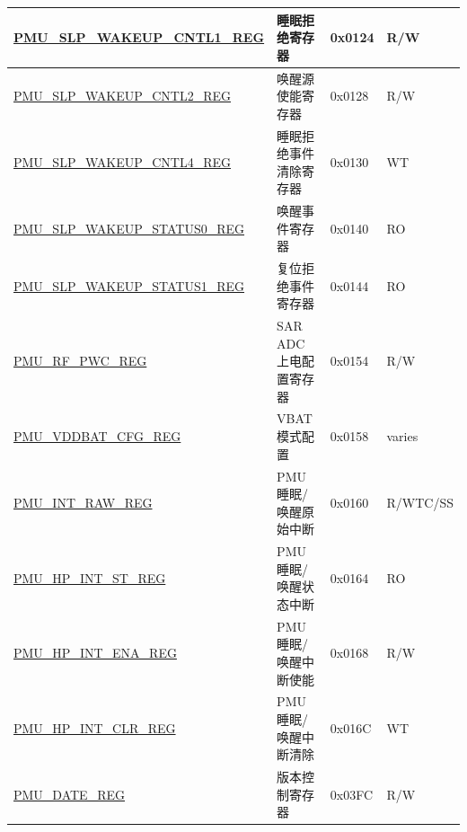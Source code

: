 \begin{longtable}{ | l | L{6cm} | l | l | }
\hyperref[regdesc:PMUSLPWAKEUPCNTL1REG]{PMU\_SLP\_WAKEUP\_CNTL1\_REG} & 睡眠拒绝寄存器 & 0x0124 & R/W \\ \hline
\hyperref[regdesc:PMUSLPWAKEUPCNTL2REG]{PMU\_SLP\_WAKEUP\_CNTL2\_REG} & 唤醒源使能寄存器 & 0x0128 & R/W \\ \hline
\hyperref[regdesc:PMUSLPWAKEUPCNTL4REG]{PMU\_SLP\_WAKEUP\_CNTL4\_REG} & 睡眠拒绝事件清除寄存器 & 0x0130 & WT \\ \hline
\hyperref[regdesc:PMUSLPWAKEUPSTATUS0REG]{PMU\_SLP\_WAKEUP\_STATUS0\_REG} & 唤醒事件寄存器 & 0x0140 & RO \\ \hline
\hyperref[regdesc:PMUSLPWAKEUPSTATUS1REG]{PMU\_SLP\_WAKEUP\_STATUS1\_REG} & 复位拒绝事件寄存器 & 0x0144 & RO \\ \hline
\hyperref[regdesc:PMURFPWCREG]{PMU\_RF\_PWC\_REG} & SAR ADC 上电配置寄存器 & 0x0154 & R/W \\ \hline
\hyperref[regdesc:PMUVDDBATCFGREG]{PMU\_VDDBAT\_CFG\_REG} & VBAT 模式配置 & 0x0158 & varies \\ \hline
\hyperref[regdesc:PMUINTRAWREG]{PMU\_INT\_RAW\_REG} & PMU 睡眠/唤醒原始中断 & 0x0160 & R/WTC/SS \\ \hline
\hyperref[regdesc:PMUHPINTSTREG]{PMU\_HP\_INT\_ST\_REG} & PMU 睡眠/唤醒状态中断 & 0x0164 & RO \\ \hline
\hyperref[regdesc:PMUHPINTENAREG]{PMU\_HP\_INT\_ENA\_REG} & PMU 睡眠/唤醒中断使能 & 0x0168 & R/W \\ \hline
\hyperref[regdesc:PMUHPINTCLRREG]{PMU\_HP\_INT\_CLR\_REG} & PMU 睡眠/唤醒中断清除 & 0x016C & WT \\ \hline
\hyperref[regdesc:PMUDATEREG]{PMU\_DATE\_REG} & 版本控制寄存器 & 0x03FC & R/W \\ \hline
\end{longtable}

